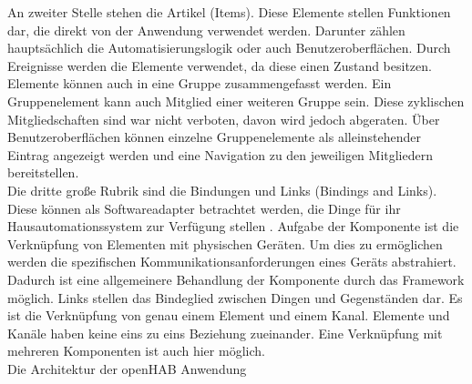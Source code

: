    An zweiter Stelle stehen die Artikel (Items). Diese Elemente stellen Funktionen dar, die direkt von der Anwendung verwendet 
    werden. Darunter zählen hauptsächlich die Automatisierungslogik oder auch Benutzeroberflächen. Durch Ereignisse werden die 
    Elemente verwendet, da diese einen Zustand besitzen. 
    \\
    Elemente können auch in eine Gruppe zusammengefasst werden. Ein Gruppenelement kann auch Mitglied einer weiteren Gruppe sein. 
    Diese zyklischen Mitgliedschaften sind war nicht verboten, davon wird jedoch abgeraten. Über Benutzeroberflächen können 
    einzelne Gruppenelemente als alleinstehender Eintrag angezeigt werden und eine Navigation zu den jeweiligen Mitgliedern 
    bereitstellen. 
    \\
    \linebreak
    Die dritte große Rubrik sind die Bindungen und Links (Bindings and Links). Diese können als Softwareadapter betrachtet werden, 
    die Dinge für ihr Hausautomationssystem zur Verfügung stellen \cite{openHAB-article}. Aufgabe der Komponente ist die Verknüpfung 
    von Elementen mit physischen Geräten. Um dies zu ermöglichen werden die spezifischen Kommunikationsanforderungen eines Geräts 
    abstrahiert. Dadurch ist eine allgemeinere Behandlung der Komponente durch das Framework möglich. Links stellen das Bindeglied 
    zwischen Dingen und Gegenständen dar. Es ist die Verknüpfung von genau einem Element und einem Kanal. Elemente und 
    Kanäle haben keine eins zu eins Beziehung zueinander. Eine Verknüpfung mit mehreren Komponenten ist auch hier möglich. 
    \\
    \linebreak
    Die Architektur der openHAB Anwendung %

